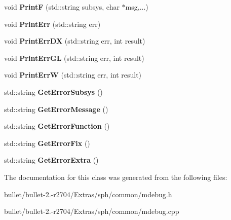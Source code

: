 \begin{DoxyCompactItemize}
\item 
\hypertarget{class_c_error_a43d34b572a57c3ae795985034c3ec558}{void {\bfseries Print\+F} (std\+::string subsys, char $\ast$msg,...)}\label{class_c_error_a43d34b572a57c3ae795985034c3ec558}

\item 
\hypertarget{class_c_error_ae9c96c8d33cdec670b69a8e629c1259e}{void {\bfseries Print\+Err} (std\+::string err)}\label{class_c_error_ae9c96c8d33cdec670b69a8e629c1259e}

\item 
\hypertarget{class_c_error_a4249b3060de5b7275dd57d416b8fd885}{void {\bfseries Print\+Err\+D\+X} (std\+::string err, int result)}\label{class_c_error_a4249b3060de5b7275dd57d416b8fd885}

\item 
\hypertarget{class_c_error_a009532aa5dcbe95294a7576a9f804088}{void {\bfseries Print\+Err\+G\+L} (std\+::string err, int result)}\label{class_c_error_a009532aa5dcbe95294a7576a9f804088}

\item 
\hypertarget{class_c_error_a3b8e745ade3a77d1dd0d623566f0a56b}{void {\bfseries Print\+Err\+W} (std\+::string err, int result)}\label{class_c_error_a3b8e745ade3a77d1dd0d623566f0a56b}

\item 
\hypertarget{class_c_error_a6f397e1740c0beb2957ba9977988ccbd}{std\+::string {\bfseries Get\+Error\+Subsys} ()}\label{class_c_error_a6f397e1740c0beb2957ba9977988ccbd}

\item 
\hypertarget{class_c_error_ab213021b160454053c95ad90e1da1b79}{std\+::string {\bfseries Get\+Error\+Message} ()}\label{class_c_error_ab213021b160454053c95ad90e1da1b79}

\item 
\hypertarget{class_c_error_a2c927354158b5a32a2d1451ad4d49c54}{std\+::string {\bfseries Get\+Error\+Function} ()}\label{class_c_error_a2c927354158b5a32a2d1451ad4d49c54}

\item 
\hypertarget{class_c_error_af94a2ccc3d32b31bcddb92a199c96047}{std\+::string {\bfseries Get\+Error\+Fix} ()}\label{class_c_error_af94a2ccc3d32b31bcddb92a199c96047}

\item 
\hypertarget{class_c_error_a1533bb8b83c25768f0ad399d7a9bab8b}{std\+::string {\bfseries Get\+Error\+Extra} ()}\label{class_c_error_a1533bb8b83c25768f0ad399d7a9bab8b}

\end{DoxyCompactItemize}


The documentation for this class was generated from the following files\+:\begin{DoxyCompactItemize}
\item 
bullet/bullet-\/2.-\/r2704/\+Extras/sph/common/mdebug.\+h\item 
bullet/bullet-\/2.-\/r2704/\+Extras/sph/common/mdebug.\+cpp\end{DoxyCompactItemize}
